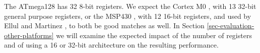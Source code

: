 The ATmega128 has 32 8-bit registers. We expect the Cortex M0 \cite{ARM:2009vz}, with 13 32-bit general purpose registers, or the MSP430 \cite{TexasInstrumentsIncorporated:MSP430F1611Datasheet}, with 12 16-bit registers, and used by Ellul and Martinez \cite{Ellul:2010iw}, to both be good matches as well. In Section \ref{sec-evaluation-other-platforms} we will examine the expected impact of the number of registers and of using a 16 or 32-bit architecture on the resulting performance.

